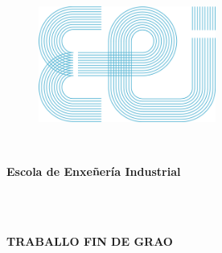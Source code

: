 \documentclass[11pt,twoside]{book}
\begin{document}
\cleardoublepage

\pagestyle{empty}


\renewcommand{\documento}{MEMORIA}

\begin{center}
\begin{figure}[htbp]
\begin{center}
\includegraphics[angle=0, height=3.8cm]{images/EEILogo.png}
\end{center}
\end{figure}
\ \\
\begin{large}
\begin{center}
\color{blue}\textbf{Escola de Enxeñería Industrial}
\end{center}
\end{large}
\ \\
\ \\
\begin{large}
\begin{center}
\textbf{TRABALLO FIN DE GRAO}
\end{center}
\end{large}
\ \\
\ \\
\begin{large}
\begin{center}
{\titulouno}
\end{center}
\end{large}
\ \\
\ \\
\begin{normalsize}

\end{normalsize}
\end{center}
\end{document}
